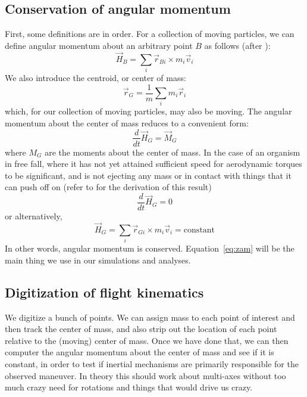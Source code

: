 \documentclass{amsart}
\begin{document}
\subsection{Conservation of angular momentum}
First, some definitions are in order.  For a collection of moving particles, we can define angular momentum about an arbitrary point $B$ as follows (after \cite{Baruh:1999}):
\begin{equation}
\vec{H}_B = \sum_i \vec{r}_{Bi} \times m_i \vec{v}_i
\end{equation}
We also introduce the centroid, or center of mass: 
\begin{equation}
\vec{r}_G = \frac{1}{m} \sum_i m_i \vec{r}_i
\end{equation}
which, for our collection of moving particles, may also be moving.  The angular momentum about the center of mass reduces to a convenient form:
\begin{equation}
\frac{d}{dt} \vec{H}_G = \vec{M}_G
\end{equation}
where $M_G$ are the moments about the center of mass. In the case of an organism in free fall, where it has not yet attained sufficient speed for aerodynamic torques to be significant, and is not ejecting any mass or in contact with things that it can push off on (refer to \cite{Baruh:1999} for the derivation of this result) 
\begin{equation}
\frac{d}{dt} \vec{H}_G = 0
\end{equation}
or alternatively,
\begin{equation}
\vec{H}_G = \sum_i \vec{r}_{Gi} \times m_i \vec{v}_i = \mbox{constant}
\label{eq:zam}
\end{equation}
In other words, angular momentum is conserved.  Equation~\ref{eq:zam} will be the main thing we use in our simulations and analyses. 

\subsection{Digitization of flight kinematics} 
We digitize a bunch of points.  We can assign mass to each point of interest and then track the center of mass, and also strip out the location of each point relative to the (moving) center of mass.  Once we have done that, we can then computer the angular momentum about the center of mass and see if it is constant, in order to test if inertial mechanisms are primarily responsible for the observed maneuver.  In theory this should work about multi-axes without too much crazy need for rotations and things that would drive us crazy.  
\end{document}
